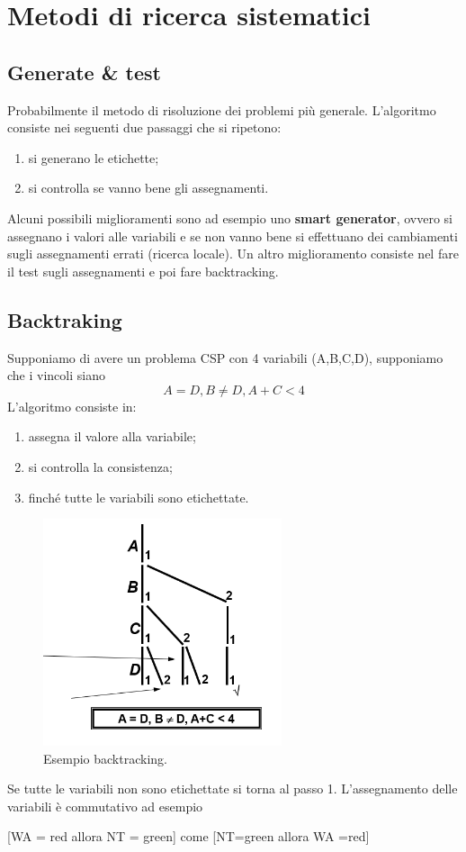 \section{Metodi di ricerca sistematici}
\subsection{Generate \& test}
Probabilmente il metodo di risoluzione dei problemi più generale. L'algoritmo consiste nei seguenti due passaggi che si ripetono:
\begin{enumerate}
    \item si generano le etichette;
    \item si controlla se vanno bene gli assegnamenti.
\end{enumerate}
Alcuni possibili miglioramenti sono ad esempio uno \textbf{smart generator}, ovvero si assegnano i valori alle variabili e se non vanno bene si effettuano dei cambiamenti sugli assegnamenti errati (ricerca locale). Un altro miglioramento consiste nel fare il test sugli assegnamenti e poi fare backtracking. 
\subsection{Backtraking}
Supponiamo di avere un problema CSP con 4 variabili (A,B,C,D), supponiamo che i vincoli siano 
\[A=D, B \neq D, A+C < 4\]
L'algoritmo consiste in:
\begin{enumerate}
    \item assegna il valore alla variabile;
    \item si controlla la consistenza;
    \item finché tutte le variabili sono etichettate.
\end{enumerate}

\begin{figure}[H]
	\centering
    \includegraphics[width=7cm, keepaspectratio]{img/backtrack.png}
	\caption{Esempio backtracking.}\label{fig:es_backtracking}
\end{figure}
\noindent Se tutte le variabili non sono etichettate si torna al passo 1. 
 L'assegnamento delle variabili è commutativo ad esempio 
\begin{center}
  [WA = red allora NT = green] come [NT=green allora WA =red]  
\end{center}

